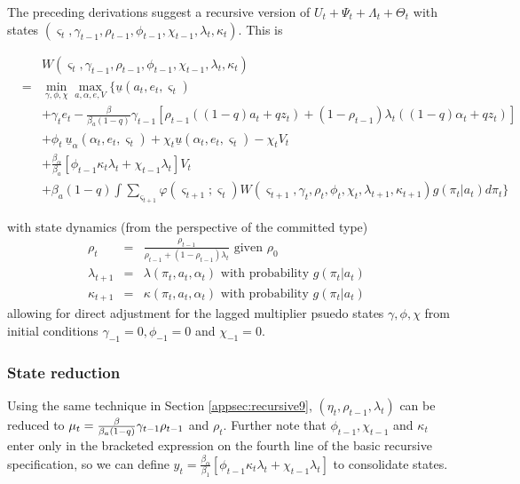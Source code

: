 \documentclass[12pt,letter,leqno]{article}
\theoremstyle{asn}
\theoremstyle{lem}
\theoremstyle{slem}
\theoremstyle{prop}
\theoremstyle{appprop}
\theoremstyle{rem}
\theoremstyle{defn}
\begin{document}
\begin{oldversion}
The preceding derivations suggest a recursive
version of $U_{t}+\Psi _{t}+\Lambda _{t}+\Theta _{t}$ with states $(\varsigma
_{t},\gamma _{t-1},\rho _{t-1},\phi _{t-1},\chi _{t-1},\lambda _{t},\kappa
_{t})$. This is

\begin{eqnarray*}
&&W(\varsigma _{t},\gamma _{t-1},\rho _{t-1},\phi _{t-1},\chi _{t-1},\lambda
_{t},\kappa _{t}) \\
&=&\min_{\gamma ,\phi ,\chi }\max_{a,\alpha ,e,V}\{ \underline{u}
(a_{t},e_{t},\varsigma _{t}) \\
&&+\gamma _{t}e_{t}-\frac{\beta }{\beta_{a}(1-q)}\gamma
_{t-1}[\rho _{t-1}((1-q)a_{t}+qz_{t})+(1-\rho _{t-1})\lambda
_{t}((1-q)\alpha _{t}+qz_{t})] \\
&&+\phi _{t}~\underline{u}_{\alpha }(\alpha
_{t},e_{t},\varsigma _{t})+\chi _{t}\underline{u}%
(\alpha _{t},e_{t},\varsigma _{t})-\chi
_{t}V_{t} \\
&&+\frac{\beta_{\alpha}}{\beta_{a}}\left[ \phi _{t-1}\kappa
_{t}\lambda _{t}+\chi _{t-1}\lambda _{t}\right] V_{t} \\
&&+\beta_{a}(1-q)\int \sum_{\varsigma _{t+1}}\varphi (\varsigma
_{t+1};\varsigma _{t})W(\varsigma _{t+1},\gamma _{t},\rho _{t},\phi
_{t},\chi _{t},\lambda _{t+1},\kappa _{t+1})g(\pi _{t}|a_{t})d\pi _{t}\}
\end{eqnarray*}%


with state dynamics (from the perspective of the committed type) 
\begin{eqnarray*}
\rho _{t} &=&\frac{\rho _{t-1}}{\rho _{t-1}+(1-\rho _{t-1})\lambda _{t}}%
\text{ given }\rho _{0} \\
\lambda _{t+1} &=&\lambda (\pi _{t},a_{t},\alpha _{t})\text{ with
probability }g(\pi _{t}|a_{t}) \\
\kappa _{t+1} &=&\kappa (\pi _{t},a_{t},\alpha _{t})\text{ with probability }%
g(\pi _{t}|a_{t})\text{ }
\end{eqnarray*}%
allowing for direct adjustment for the lagged multiplier psuedo states $%
\gamma ,\phi ,\chi $ from initial conditions $\gamma _{-1}=0,\phi _{-1}=0$
and $\chi _{-1}=0$.

\subsubsection{State reduction}
Using the same technique in Section \ref{appsec:recursive9}, $(\eta _{t},\rho
_{t-1},\lambda _{t})$ can be reduced to $\mu _{t}=\frac{%
\beta }{\beta_{a}(1-q)}\gamma _{t-1}\rho _{t-1}$ and $\rho _{t}$.
Further note that $\phi _{t-1},\chi _{t-1}$ and $\kappa _{t}$ enter only in the
bracketed expression on the fourth line of the basic recursive
specification, so we can define $y_{t}=\frac{\beta_{\alpha}}{\beta
_{1}}\left[ \phi _{t-1}\kappa _{t}\lambda _{t}+\chi _{t-1}\lambda _{t}\right]
$ to consolidate states. 


\end{oldversion}
\end{document}

